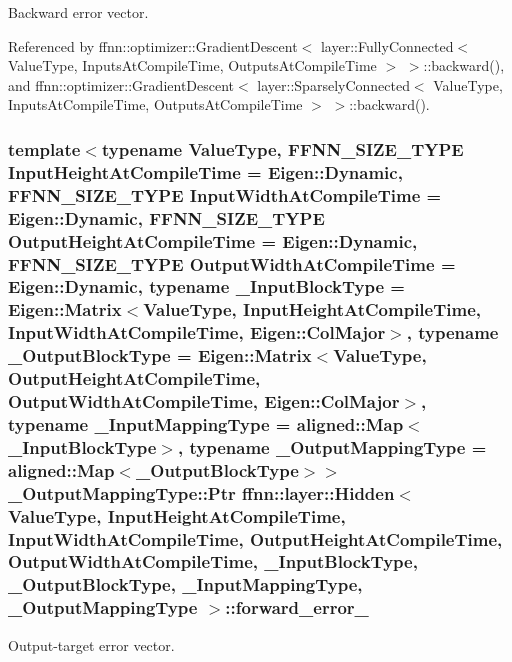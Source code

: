 Backward error vector. 



Referenced by ffnn\-::optimizer\-::\-Gradient\-Descent$<$ layer\-::\-Fully\-Connected$<$ Value\-Type, Inputs\-At\-Compile\-Time, Outputs\-At\-Compile\-Time $>$ $>$\-::backward(), and ffnn\-::optimizer\-::\-Gradient\-Descent$<$ layer\-::\-Sparsely\-Connected$<$ Value\-Type, Inputs\-At\-Compile\-Time, Outputs\-At\-Compile\-Time $>$ $>$\-::backward().

\hypertarget{classffnn_1_1layer_1_1_hidden_a9ca7423a16607df0a278002c249e9d1b}{
\subsubsection[{forward\-\_\-error\-\_\-}]{\setlength{\rightskip}{0pt plus 5cm}template$<$typename Value\-Type, F\-F\-N\-N\-\_\-\-S\-I\-Z\-E\-\_\-\-T\-Y\-P\-E Input\-Height\-At\-Compile\-Time = Eigen\-::\-Dynamic, F\-F\-N\-N\-\_\-\-S\-I\-Z\-E\-\_\-\-T\-Y\-P\-E Input\-Width\-At\-Compile\-Time = Eigen\-::\-Dynamic, F\-F\-N\-N\-\_\-\-S\-I\-Z\-E\-\_\-\-T\-Y\-P\-E Output\-Height\-At\-Compile\-Time = Eigen\-::\-Dynamic, F\-F\-N\-N\-\_\-\-S\-I\-Z\-E\-\_\-\-T\-Y\-P\-E Output\-Width\-At\-Compile\-Time = Eigen\-::\-Dynamic, typename \-\_\-\-Input\-Block\-Type = Eigen\-::\-Matrix$<$\-Value\-Type, Input\-Height\-At\-Compile\-Time, Input\-Width\-At\-Compile\-Time, Eigen\-::\-Col\-Major$>$, typename \-\_\-\-Output\-Block\-Type = Eigen\-::\-Matrix$<$\-Value\-Type, Output\-Height\-At\-Compile\-Time, Output\-Width\-At\-Compile\-Time, Eigen\-::\-Col\-Major$>$, typename \-\_\-\-Input\-Mapping\-Type = aligned\-::\-Map$<$\-\_\-\-Input\-Block\-Type$>$, typename \-\_\-\-Output\-Mapping\-Type = aligned\-::\-Map$<$\-\_\-\-Output\-Block\-Type$>$$>$ \-\_\-\-Output\-Mapping\-Type\-::\-Ptr {\bf ffnn\-::layer\-::\-Hidden}$<$ Value\-Type, Input\-Height\-At\-Compile\-Time, Input\-Width\-At\-Compile\-Time, Output\-Height\-At\-Compile\-Time, Output\-Width\-At\-Compile\-Time, \-\_\-\-Input\-Block\-Type, \-\_\-\-Output\-Block\-Type, \-\_\-\-Input\-Mapping\-Type, \-\_\-\-Output\-Mapping\-Type $>$\-::forward\-\_\-error\-\_\-\hspace{0.3cm}{\ttfamily [protected]}}}\label{classffnn_1_1layer_1_1_hidden_a9ca7423a16607df0a278002c249e9d1b}


Output-\/target error vector. 



